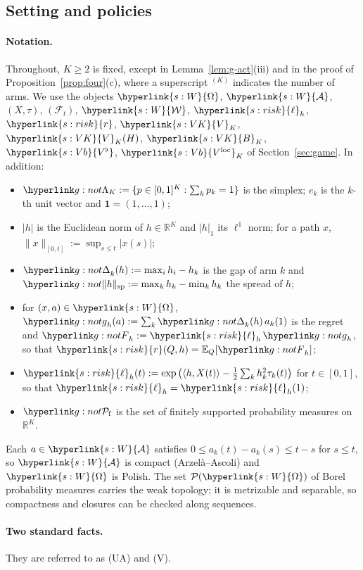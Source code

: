 \documentclass[11pt]{article}
\newcommand{\dt}[1]{\hypertarget{#1}{}}
\DeclareRobustCommand{\sy}[2]{{\hyperlink{#1}{#2}}}
\newcommand{\R}{\mathbb{R}}
\newcommand{\E}{\mathbb{E}}
\newcommand{\1}{\mathbf{1}}
\newcommand{\Wc}{\sy{s:W}{\mathcal W}}
\newcommand{\Om}{\sy{s:W}{\Omega}}
\newcommand{\Al}{\sy{s:W}{\mathcal A}}
\newcommand{\rk}{\sy{s:risk}{r}}
\newcommand{\lh}{\sy{s:risk}{\ell}}
\newcommand{\VK}{\sy{s:VK}{V}}
\newcommand{\BK}{\sy{s:VK}{B}}
\newcommand{\Vb}{\sy{s:Vb}{V^\flat}}
\newcommand{\Vloc}{\sy{s:Vb}{V^{\mathrm{loc}}}}
\begin{document}
\subsection{Setting and policies}\label{sec:app-g-setting}

\paragraph{Notation.}\dt{g:not} Throughout, $K\ge2$ is fixed, except in Lemma~\ref{lem:g-act}(iii) and in the proof of Proposition~\ref{prop:four}(c), where a
superscript $^{(K)}$ indicates the number of arms. We use the objects $\Om$, $\Al$, $(X,\tau)$, $(\mathcal F_t)$, $\Wc$, $\lh_h$, $\rk$, $\VK_K$, $\VK_K(H)$, $\BK_K$,
$\Vb$, $\Vloc_K$ of Section~\ref{sec:game}. In addition:
\begin{itemize}
\item $\gSmp:=\{p\in[0,1]^K:\sum_kp_k=1\}$ is the simplex; $e_k$ is the $k$-th unit vector and $\1=(1,\dots,1)$;
\item $|h|$ is the Euclidean norm of $h\in\R^K$ and $|h|_1$ its $\ell^1$ norm; for a path $x$, $\|x\|_{[0,t]}:=\sup_{s\le t}|x(s)|$;
\item $\gGp_k(h):=\max_ih_i-h_k$ is the gap of arm $k$ and $\gsp h:=\max_kh_k-\min_kh_k$ the spread of $h$;
\item for $(x,a)\in\Om$, $\ggh_h(a):=\sum_k\gGp_k(h)\,a_k(1)$ is the regret and $\gFh_h:=\lh_h\,\ggh_h$, so that $\rk(Q,h)=\E_Q[\gFh_h]$;
\item $\lh_h(t):=\exp\big(\langle h,X(t)\rangle-\frac12\sum_kh_k^2\tau_k(t)\big)$ for $t\in[0,1]$, so that $\lh_h=\lh_h(1)$;
\item $\gPf$ is the set of finitely supported probability measures on $\R^K$.
\end{itemize}
Each $a\in\Al$ satisfies $0\le a_k(t)-a_k(s)\le t-s$ for $s\le t$, so $\Al$ is compact (Arzelà--Ascoli) and $\Om$ is Polish. The set $\mathcal P(\Om)$ of Borel
probability measures carries the weak topology; it is metrizable and separable, so compactness and closures can be checked along sequences.

\paragraph{Two standard facts.} They are referred to as (UA) and (V).
\end{document}
